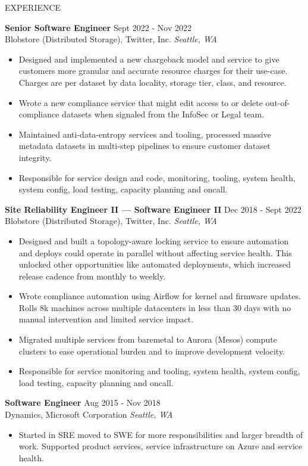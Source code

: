\documentclass{resume}
\begin{document}
\begin{rSection}{EXPERIENCE}

\textbf{Senior Software Engineer} \hfill Sept 2022 - Nov 2022\\
Blobstore (Distributed Storage), Twitter, Inc. \hfill \textit{Seattle, WA}
 \begin{itemize}
    \itemsep -3pt {} 
     \item Designed and implemented a new chargeback model and service to give customers more granular and accurate resource charges for their use-case. Charges are per dataset by data locality, storage tier, class, and resource.
     \item Wrote a new compliance service that might edit access to or delete out-of-compliance datasets when signaled from the InfoSec or Legal team.
     \item Maintained anti-data-entropy services and tooling, processed massive metadata datasets in multi-step pipelines to ensure customer dataset integrity.
     \item Responsible for service design and code, monitoring, tooling, system health, system config, load testing, capacity planning and oncall.
 \end{itemize}

 \textbf{ Site Reliability Engineer II --- Software Engineer II} \hfill Dec 2018 - Sept 2022 \\
Blobstore (Distributed Storage), Twitter, Inc. \hfill \textit{Seattle, WA}
 \begin{itemize}
    \itemsep -3pt {} 
     \item Designed and built a topology-aware locking service to ensure automation and deploys could operate in parallel without affecting service health. This unlocked other opportunities like automated deployments, which increased release cadence from monthly to weekly.
     \item Wrote compliance automation using Airflow for kernel and firmware updates. Rolls 8k machines across multiple datacenters in less than 30 days with no manual intervention and limited service impact. 
     \item Migrated multiple services from baremetal to Aurora (Mesos) compute clusters to ease operational burden and to improve development velocity.
     \item Responsible for service monitoring and tooling, system health, system config, load testing, capacity planning and oncall.
 \end{itemize}

\textbf{Software Engineer} \hfill Aug 2015 - Nov 2018\\
Dynamics, Microsoft Corporation \hfill \textit{Seattle, WA}
 \begin{itemize}
    \itemsep -3pt {} 
     \item Started in SRE moved to SWE for more responsibilities and larger breadth of work. Supported product services, service infrastructure on Azure and service health. 
 \end{itemize}
\end{rSection} 
\end{document}

